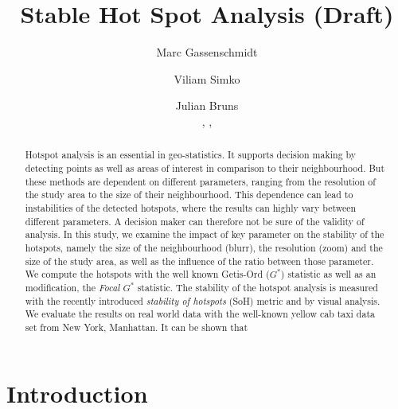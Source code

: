 \documentclass{itatnew}
\begin{document}
\title{Stable Hot Spot Analysis (Draft)}

\author{
  Marc Gassenschmidt \and
  Viliam Simko  \and
  Julian Bruns
  \\
  ,
  ,
}

  
\maketitle              %



\begin{abstract}
Hotspot analysis is an essential in geo-statistics. It supports decision making by detecting points as well as areas of interest in comparison to their neighbourhood. But these methods are dependent on different parameters, ranging from the resolution of the study area to the size of their neighbourhood. This dependence can lead to instabilities of the detected hotspots, where the results can highly vary between different parameters. A decision maker can therefore not be sure of the validity of analysis. In this study, we examine the impact of key parameter on the stability of the hotspots, namely the size of the neighbourhood (blurr), the resolution (zoom) and the size of the study area, as well as the influence of the ratio between those parameter. We compute the hotspots with the well known Getis-Ord ($G^*$) statistic as well as an modification, the \emph{Focal $G^*$} statistic. The stability of the hotspot analysis is measured with the recently introduced \emph{stability of hotspots} (SoH) metric and by visual analysis. We evaluate the results on real world data with the well-known yellow cab taxi data set from New York, Manhattan. It can be shown that 
   
\end{abstract}


\section{Introduction}
\end{document}
